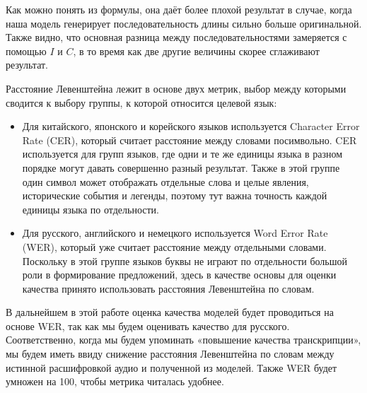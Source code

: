 Как можно понять из формулы, она даёт более плохой результат в случае, когда наша модель генерирует последовательность длины сильно больше оригинальной.
Также видно, что основная разница между последовательностями замеряется с помощью $I$ и $C$, в то время как две другие величины скорее сглаживают результат.

Расстояние Левенштейна лежит в основе двух метрик, выбор между которыми сводится к выбору группы, к которой относится целевой язык:
\begin{itemize}
  \item Для китайского, японского и корейского языков используется Character Error Rate (CER), который считает расстояние между словами посимвольно.
  CER используется для групп языков, где одни и те же единицы языка в разном порядке могут давать совершенно разный результат.
  Также в этой группе один символ может отображать отдельные слова и целые явления, исторические события и легенды, поэтому тут важна точность каждой единицы языка по отдельности.
  \item Для русского, английского и немецкого используется Word Error Rate (WER)\cite{marzal2002computation}, который уже считает расстояние между отдельными словами.
  Поскольку в этой группе языков буквы не играют по отдельности большой роли в формирование предложений, здесь в качестве основы для оценки качества принято использовать расстояния Левенштейна по словам.
\end{itemize}

В дальнейшем в этой работе оценка качества моделей будет проводиться на основе WER, так как мы будем оценивать качество для русского.
Соответственно, когда мы будем упоминать «повышение качества транскрипции», мы будем иметь ввиду снижение расстояния Левенштейна по словам между истинной расшифровкой аудио и полученной из моделей.
Также WER будет умножен на 100, чтобы метрика читалась удобнее.

